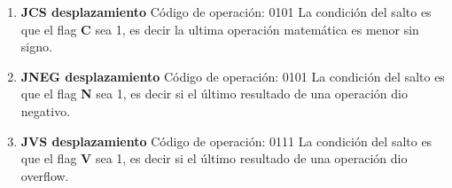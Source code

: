 \begin{enumerate}
\item \textbf{JCS desplazamiento}
Código de operación: 0101
La condición del salto es que el flag \textbf{C} sea 1, es decir la ultima operación matemática es menor sin signo.

\item \textbf{JNEG desplazamiento}
Código de operación: 0101
La condición del salto es que el flag \textbf{N} sea 1, es decir si el último resultado de una operación dio negativo.

\item \textbf{JVS desplazamiento}
Código de operación: 0111
La condición del salto es que el flag \textbf{V} sea 1, es decir si el último resultado de una operación dio overflow.

\end{enumerate}